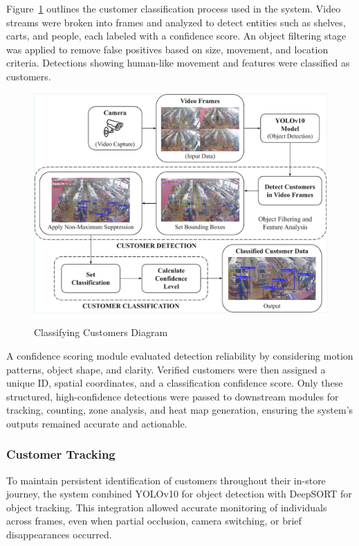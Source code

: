 {Figure~\ref{fig:3.16} outlines the customer classification process used in the system. Video streams were broken into frames and analyzed to detect entities such as shelves, carts, and people, each labeled with a confidence score. An object filtering stage was applied to remove false positives based on size, movement, and location criteria. Detections showing human-like movement and features were classified as customers.

\begin{figure}[H]
	\caption[Classifying Customers Diagram]{\newline \newline Classifying Customers Diagram}
	\centering
	\includegraphics[width=0.75\linewidth]{fig/3.16.pdf}
	\label{fig:3.16}
\end{figure}

A confidence scoring module evaluated detection reliability by considering motion patterns, object shape, and clarity. Verified customers were then assigned a unique ID, spatial coordinates, and a classification confidence score. Only these structured, high-confidence detections were passed to downstream modules for tracking, counting, zone analysis, and heat map generation, ensuring the system’s outputs remained accurate and actionable.

\subsubsection{Customer Tracking}

To maintain persistent identification of customers throughout their in-store journey, the system combined YOLOv10 for object detection with DeepSORT for object tracking. This integration allowed accurate monitoring of individuals across frames, even when partial occlusion, camera switching, or brief disappearances occurred.

}
